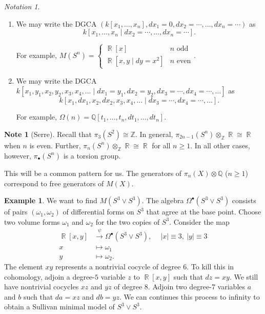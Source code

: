 \documentclass[10pt,letterpaper,cm]{nupset}
\theoremstyle{definition}
\newtheorem{exmp}[defn]{Example}
\newtheorem{note}[defn]{Note}
\theoremstyle{theorem}
\theoremstyle{remark}
\newtheorem*{notation}{Notation}
\newcommand{\Q}{\mathbb Q}
\DeclareMathOperator{\R}{\mathbb{R}}
\newcommand{\Z}{\mathbb Z}
\newcommand{\1}{\mathbb{1}}
\newcommand{\0}{\vec 0}
\newcommand{\be}{\begin{enumerate}}
\newcommand{\ee}{\end{enumerate}}
\begin{document}
\begin{notation} $ $
\be
\item We may write the DGCA $\left(k\left[x_1, \ldots, x_n\right], d{x_1} = 0, d{x_2} = \cdots,  \ldots,  d{x_n} = \cdots\right)$ as 
\[
k\left[x_1, \ldots, x_n \mid d{x_2} = \cdots, \ldots, d{x_n} = \cdots\right].
\]

For example, $M(S^n) = \begin{cases} \R\left[x\right] & \text{$n$ odd} \\ \R\left[x,y \mid d{y} = x^2\right] &  \text{$n$ even} \end{cases}$.
\item We may write the DGCA $k\left[x_1, y_1, x_2, y_2, x_3, x_4, \ldots \mid d{x_1} = y_1, d{x_2} = y_2, d{x_3} = \cdots, d{x_4} = \cdots, \ldots \right]$ as  
\[
k\left[x_1, d{x_1}, x_2, d{x_2}, x_3, x_4, \ldots \mid d{x_3} = \cdots, d{x_4} = \cdots, \ldots\right]
.\]

For example, $\Omega(n) = \Q\left[t_1, \ldots, t_n, d{t_1}, \ldots, d{t_n}\right]$.
\ee
\end{notation}


\begin{note}[Serre]
Recall that $\pi_3(S^2) \cong \Z$. In general, $\pi_{2n -1}(S^n) \otimes_{\Z} \R \cong \R$ when $n$ is even. Further, $\pi_n(S^n) \otimes_{\Z} \R \cong \R$ for all $n \geq 1$. In all other cases, however, $\pi_{\bullet}(S^n)$ is a torsion group.

\medskip

This will be a common pattern for us. The  generators of $\pi_n(X) \otimes \Q$ ($n \geq 1$) correspond to free generators of $M(X)$.
\end{note}

\begin{exmp}\label{Sull2}
We want to find $M(S^3 \vee S^3)$. The algebra $\Omega^{\bullet}(S^3 \vee S^3)$ consists of pairs $\left(\omega_1, \omega_2\right)$ of differential forms on $S^3$ that agree at the base point. Choose two volume forms $\omega_1$ and $\omega_2$ for the two copies of $S^3$.  Consider the map
\begin{align*}
\R\left[x,y\right] &  \xrightarrow{\psi} \Omega^{\bullet}(S^3 \vee S^3), \ \quad \left\lvert{x}\right\rvert \equiv 3, \ \left\lvert{y}\right\rvert \equiv 3
\\ x & \mapsto \omega_1
\\ y & \mapsto \omega_2.
\end{align*}
The element $xy$ represents a nontrivial cocycle of degree $6$. To kill this in cohomology, adjoin a degree-$5$ variable $z$ to $\R\left[x,y\right]$ such that $d{z} = xy$. We still have nontrivial cocycles $xz$ and $yz$ of degree $8$. Adjoin two degree-$7$ variables $a$ and $b$ such that $d{a} = xz$ and $d{b} = yz$. We can continues this process to infinity to obtain a Sullivan minimal model of $S^3 \vee S^3$. 
\end{exmp}
\end{document}
